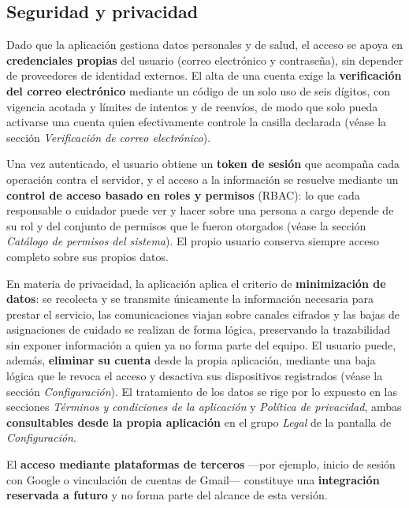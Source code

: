 \documentclass[a4paper,12pt]{article}
\begin{document}
    \subsection{Seguridad y privacidad}
    \par Dado que la aplicación gestiona datos personales y de salud, el acceso se apoya en \textbf{credenciales propias} del usuario (correo electrónico y contraseña), sin depender de proveedores de identidad externos. El alta de una cuenta exige la \textbf{verificación del correo electrónico} mediante un código de un solo uso de seis dígitos, con vigencia acotada y límites de intentos y de reenvíos, de modo que solo pueda activarse una cuenta quien efectivamente controle la casilla declarada (véase la sección \textit{Verificación de correo electrónico}).
    \par Una vez autenticado, el usuario obtiene un \textbf{token de sesión} que acompaña cada operación contra el servidor, y el acceso a la información se resuelve mediante un \textbf{control de acceso basado en roles y permisos} (RBAC): lo que cada responsable o cuidador puede ver y hacer sobre una persona a cargo depende de su rol y del conjunto de permisos que le fueron otorgados (véase la sección \textit{Catálogo de permisos del sistema}). El propio usuario conserva siempre acceso completo sobre sus propios datos.
    \par En materia de privacidad, la aplicación aplica el criterio de \textbf{minimización de datos}: se recolecta y se transmite únicamente la información necesaria para prestar el servicio, las comunicaciones viajan sobre canales cifrados y las bajas de asignaciones de cuidado se realizan de forma lógica, preservando la trazabilidad sin exponer información a quien ya no forma parte del equipo. El usuario puede, además, \textbf{eliminar su cuenta} desde la propia aplicación, mediante una baja lógica que le revoca el acceso y desactiva sus dispositivos registrados (véase la sección \textit{Configuración}). El tratamiento de los datos se rige por lo expuesto en las secciones \textit{Términos y condiciones de la aplicación} y \textit{Política de privacidad}, ambas \textbf{consultables desde la propia aplicación} en el grupo \textit{Legal} de la pantalla de \textit{Configuración}.
    \par El \textbf{acceso mediante plataformas de terceros} —por ejemplo, inicio de sesión con Google o vinculación de cuentas de Gmail— constituye una \textbf{integración reservada a futuro} y no forma parte del alcance de esta versión.
\end{document}

